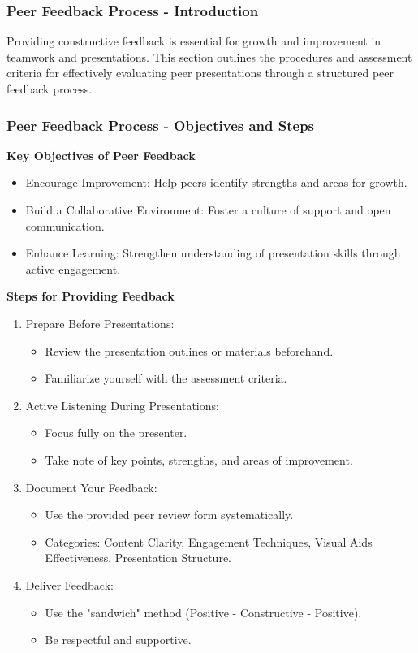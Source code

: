 \documentclass[aspectratio=169]{beamer}
\begin{document}
\begin{frame}[fragile]
    \frametitle{Peer Feedback Process - Introduction}
    Providing constructive feedback is essential for growth and improvement in teamwork and presentations. This section outlines the procedures and assessment criteria for effectively evaluating peer presentations through a structured peer feedback process.
\end{frame}

\begin{frame}[fragile]
    \frametitle{Peer Feedback Process - Objectives and Steps}
    
    \textbf{Key Objectives of Peer Feedback}
    \begin{itemize}
        \item Encourage Improvement: Help peers identify strengths and areas for growth.
        \item Build a Collaborative Environment: Foster a culture of support and open communication.
        \item Enhance Learning: Strengthen understanding of presentation skills through active engagement.
    \end{itemize}
    
    \textbf{Steps for Providing Feedback}
    \begin{enumerate}
        \item Prepare Before Presentations:
        \begin{itemize}
            \item Review the presentation outlines or materials beforehand.
            \item Familiarize yourself with the assessment criteria.
        \end{itemize}
        \item Active Listening During Presentations:
        \begin{itemize}
            \item Focus fully on the presenter.
            \item Take note of key points, strengths, and areas of improvement.
        \end{itemize}
        \item Document Your Feedback:
        \begin{itemize}
            \item Use the provided peer review form systematically.
            \item Categories: Content Clarity, Engagement Techniques, Visual Aids Effectiveness, Presentation Structure.
        \end{itemize}
        \item Deliver Feedback:
        \begin{itemize}
            \item Use the "sandwich" method (Positive - Constructive - Positive).
            \item Be respectful and supportive.
        \end{itemize}
    \end{enumerate}
\end{frame}
\end{document}
